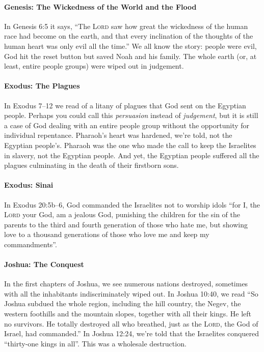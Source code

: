 \paragraph{Genesis: The Wickedness of the World and the Flood} In Genesis 6:5 it
says, \enquote{The \textsc{Lord} saw how great the wickedness of the human race
had become on the earth, and that every inclination of the thoughts of the human
heart was only evil all the time.} We all know the story: people were evil, God
hit the reset button but saved Noah and his family. The whole earth (or, at
least, entire people groups) were wiped out in judgement.

\paragraph{Exodus: The Plagues} In Exodus 7--12 we read of a litany of
plagues that God sent on the Egyptian people. Perhaps you could call this
\textit{persuasion} instead of \textit{judgement}, but it is still a case of God
dealing with an entire people group without the opportunity for individual
repentance. Pharaoh's heart was hardened, we're told, not the Egyptian people's.
Pharaoh was the one who made the call to keep the Israelites in slavery, not the
Egyptian people. And yet, the Egyptian people suffered all the plagues
culminating in the death of their firstborn sons.

\paragraph{Exodus: Sinai} In Exodus 20:5b--6, God commanded the Israelites not
to worship idols \enquote{for I, the \textsc{Lord} your God, am a jealous God,
punishing the children for the sin of the parents to the third and fourth
generation of those who hate me, but showing love to a thousand generations of
those who love me and keep my commandments}.

\paragraph{Joshua: The Conquest} In the first chapters of Joshua, we see
numerous nations destroyed, sometimes with all the inhabitants indiscriminately
wiped out. In Joshua 10:40, we read \enquote{So Joshua subdued the whole region,
including the hill country, the Negev, the western foothills and the mountain
slopes, together with all their kings. He left no survivors. He totally
destroyed all who breathed, just as the \textsc{Lord}, the God of Israel, had
commanded.} In Joshua 12:24, we're told that the Israelites conquered
\enquote{thirty-one kings in all}. This was a wholesale destruction.

